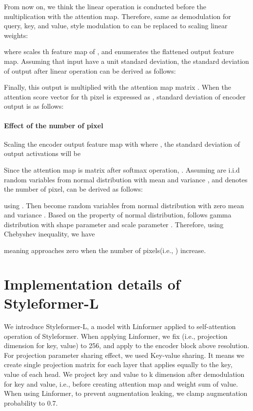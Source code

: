 \documentclass[10pt,twocolumn,letterpaper]{article}
\begin{document}
From now on, we think the linear operation is conducted before the multiplication with the attention map. Therefore, same as demodulation for query, key, and value, style modulation to  can be replaced to scaling linear weights:

where  scales th feature map of , and  enumerates the flattened output feature map. Assuming that input  have a unit standard deviation, the standard deviation of output after linear operation can be derived as follows:

Finally, this output is multiplied with the attention map matrix . When the attention score vector for th pixel is expressed as , standard deviation of encoder output is as follows:


\paragraph{Effect of the number of pixel}
Scaling the encoder output feature map  with   where
    , the standard deviation of output activations will be 

Since the attention map  is matrix after softmax operation, . Assuming  are i.i.d random variables from normal distribution with mean  and variance , and  denotes the number of pixel,  can be derived as follows:

using . Then  become random variables from normal distribution with zero mean and variance . Based on the property of normal distribution,  follows gamma distribution with shape parameter  and scale parameter . Therefore, using Chebyshev inequality, we have 

meaning  approaches zero when the number of pixels(i.e., ) increase. 

\section{Implementation details of Styleformer-L}
\label{app:E}
We introduce Styleformer-L, a model with Linformer applied to self-attention operation of Styleformer. When applying Linformer, we fix  (i.e., projection dimension for key, value) to 256, and apply to the encoder block above  resolution. For projection parameter sharing effect, we used Key-value sharing. It means we create single  projection matrix for each layer that applies equally to the key, value of each head. We project key and value to k dimension after demodulation for key and value, i.e., before creating attention map and weight sum of value. When using Linformer, to prevent augmentation leaking, we clamp augmentation probability to 0.7.
\end{document}
